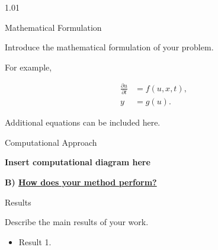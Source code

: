 \documentclass[final]{beamer}
\newlength{\colwidth}
\begin{document}
\begin{frame}[t]
\begin{columns}[t]
\begin{column}{1.01\colwidth}
\begin{block}{Mathematical Formulation}

Introduce the mathematical formulation of your problem.

For example,

\begin{align}
    \frac{\partial u}{\partial t}
    &=
    f(u,x,t),
    \\
    y
    &=
    g(u).
\end{align}

Additional equations can be included here.

\end{block}



\begin{block}{Computational Approach}

\begin{center}

%

\vspace{3cm}

\textbf{Insert computational diagram here}

\vspace{3cm}

\end{center}

\end{block}



\textcolor{ucsdblue}{
    \textbf{
        B) \underline{How does your method perform?}
    }
}


\vspace{0.5cm}


\begin{block}{Results}

Describe the main results of your work.

\vspace{0.5cm}

\begin{itemize}

    \item Result 1.


\end{itemize}
\end{block}
\end{column}
\end{columns}
\end{frame}
\end{document}
